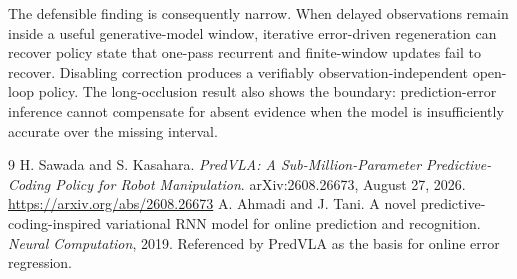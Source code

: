 \documentclass[11pt]{article}
\begin{document}
The defensible finding is consequently narrow. When delayed observations remain inside a useful generative-model window, iterative error-driven regeneration can recover policy state that one-pass recurrent and finite-window updates fail to recover. Disabling correction produces a verifiably observation-independent open-loop policy. The long-occlusion result also shows the boundary: prediction-error inference cannot compensate for absent evidence when the model is insufficiently accurate over the missing interval.

\begin{thebibliography}{9}
 H. Sawada and S. Kasahara. \emph{PredVLA: A Sub-Million-Parameter Predictive-Coding Policy for Robot Manipulation}. arXiv:2608.26673, August 27, 2026. \url{https://arxiv.org/abs/2608.26673}
 A. Ahmadi and J. Tani. A novel predictive-coding-inspired variational RNN model for online prediction and recognition. \emph{Neural Computation}, 2019. Referenced by PredVLA as the basis for online error regression.
\end{thebibliography}
\end{document}

